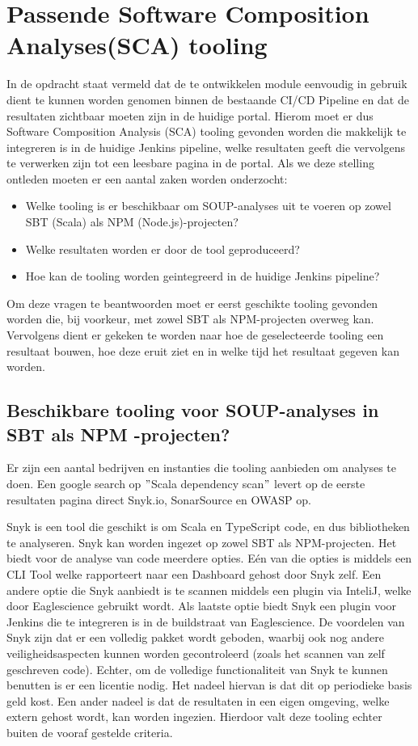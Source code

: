\section{Passende Software Composition Analyses(SCA) tooling}\label{sec:sca-tooling}

In de opdracht staat vermeld dat de te ontwikkelen module eenvoudig in gebruik dient te kunnen worden genomen binnen de bestaande CI/CD Pipeline en dat de resultaten zichtbaar moeten zijn in de huidige portal. Hierom moet er dus Software Composition Analysis (SCA) tooling gevonden worden die makkelijk te integreren is in de huidige Jenkins pipeline, welke resultaten geeft die vervolgens te verwerken zijn tot een leesbare pagina in de portal. Als we deze stelling ontleden moeten er een aantal zaken worden onderzocht:
\begin{itemize}
    \item Welke tooling is er beschikbaar om SOUP-analyses uit te voeren op zowel SBT (Scala) als NPM (Node.js)-projecten?
    \item Welke resultaten worden er door de tool geproduceerd?
    \item Hoe kan de tooling worden geintegreerd in de huidige Jenkins pipeline?
\end{itemize}
Om deze vragen te beantwoorden moet er eerst geschikte tooling gevonden worden die, bij voorkeur, met zowel SBT als NPM-projecten overweg kan. Vervolgens dient er gekeken te worden naar hoe de geselecteerde tooling een resultaat bouwen, hoe deze eruit ziet en in welke tijd het resultaat gegeven kan worden.

\subsection{Beschikbare tooling voor SOUP-analyses in SBT als NPM -projecten?}\label{subsec:ESTooling}
Er zijn een aantal bedrijven en instanties die tooling aanbieden om analyses te doen. Een google search op $"$Scala dependency scan$"$ levert op de eerste resultaten pagina direct Snyk.io, SonarSource en OWASP op.

Snyk is een tool die geschikt is om Scala en TypeScript code, en dus bibliotheken te analyseren. Snyk kan worden ingezet op zowel SBT als NPM-projecten. Het biedt voor de analyse van code meerdere opties. Eén van die opties is middels een CLI Tool welke rapporteert naar een Dashboard gehost door Snyk zelf. Een andere optie die Snyk aanbiedt is te scannen middels een plugin via InteliJ, welke door Eaglescience gebruikt wordt. Als laatste optie biedt Snyk een plugin voor Jenkins die te integreren is in de buildstraat van Eaglescience. De voordelen van Snyk zijn dat er een volledig pakket wordt geboden, waarbij ook nog andere veiligheidsaspecten kunnen worden gecontroleerd (zoals het scannen van zelf geschreven code). Echter, om de volledige functionaliteit van Snyk te kunnen benutten is er een licentie nodig. Het nadeel hiervan is dat dit op periodieke basis geld kost. Een ander nadeel is dat de resultaten in een eigen omgeving, welke extern gehost wordt, kan worden ingezien. Hierdoor valt deze tooling echter buiten de vooraf gestelde criteria.

